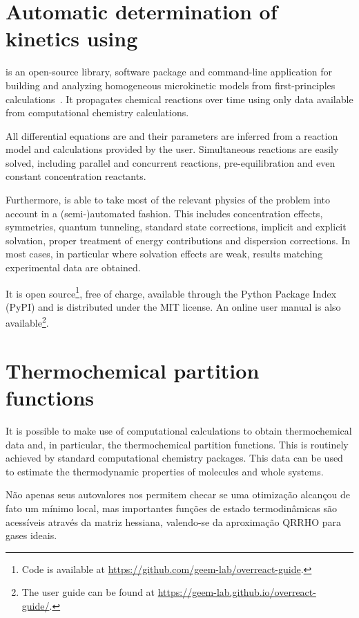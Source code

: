 \section{Automatic determination of kinetics using \overreact}%
\label{sec:overreact-methods}

\overreact is an open-source library, software package and command-line
application for building and analyzing
homogeneous microkinetic models from first-principles
calculations~\cite{Schneider2022,overreact2021zenodo}.
It propagates chemical reactions over time using only data available from
computational chemistry calculations.

All differential equations are and their parameters are inferred from a
reaction model and calculations provided by the user.
Simultaneous reactions are easily solved, including parallel and concurrent
reactions, pre-equilibration and even constant concentration reactants.

Furthermore, \overreact is able to take most of the relevant physics of the problem into
account in a (semi-)automated fashion.
This includes concentration effects, symmetries, quantum
tunneling, standard state corrections, implicit and explicit solvation, proper treatment
of energy contributions and dispersion corrections.
In most cases, in particular where solvation effects are weak, results matching
experimental data are obtained.

It is open source\footnote{Code is available at
\url{https://github.com/geem-lab/overreact-guide}.}, free of charge, available through the Python Package Index (PyPI) and is
distributed under the MIT license.
An online user manual is also
available\footnote{The user guide can be found at \url{https://geem-lab.github.io/overreact-guide/}.}.



\section{Thermochemical partition functions}

It is possible to make use of computational calculations to obtain
thermochemical data and, in particular, the thermochemical partition
functions.
This is routinely achieved by standard computational chemistry packages.
This data can be used to estimate the thermodynamic properties of molecules and
whole systems.


Não apenas seus autovalores nos permitem checar se uma otimização alcançou de fato um mínimo local, mas importantes funções de estado termodinâmicas são acessíveis através da matriz hessiana, valendo-se da aproximação QRRHO para gases ideais.



